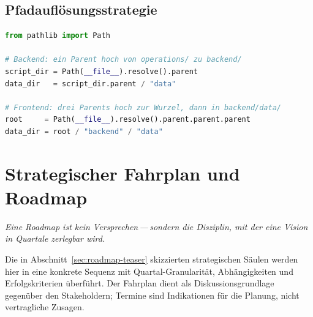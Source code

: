 \documentclass[11pt, a4paper, oneside, openany]{report}
\begin{document}
\section{Pfadauflösungsstrategie}

\begin{lstlisting}[language=Python, caption={Pfadauflösungsmuster\;---\;keine hartcodierten Pfade}]
from pathlib import Path

# Backend: ein Parent hoch von operations/ zu backend/
script_dir = Path(__file__).resolve().parent
data_dir   = script_dir.parent / "data"

# Frontend: drei Parents hoch zur Wurzel, dann in backend/data/
root     = Path(__file__).resolve().parent.parent.parent
data_dir = root / "backend" / "data"
\end{lstlisting}


\chapter{Strategischer Fahrplan und Roadmap}
\label{ch:roadmap}

\epigraph{\itshape Eine Roadmap ist kein Versprechen\,---\,sondern die Disziplin, mit der eine Vision in Quartale zerlegbar wird.}{}

Die in Abschnitt~\ref{sec:roadmap-teaser} skizzierten strategischen Säulen werden hier in eine konkrete Sequenz mit Quartal-Granularität, Abhängigkeiten und Erfolgskriterien überführt. Der Fahrplan dient als Diskussionsgrundlage gegenüber den Stakeholdern; Termine sind Indikationen für die Planung, nicht vertragliche Zusagen.
\end{document}
